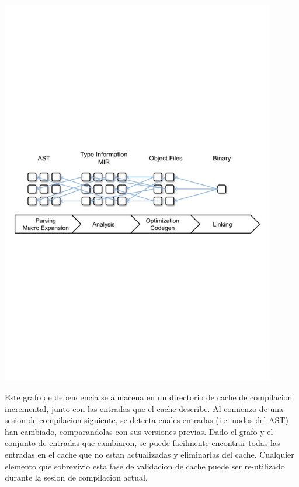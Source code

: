 \documentclass[12pt, a4paper]{report}
\begin{document}
\noindent
\includegraphics[width=0.9\textwidth]{woe16_compiler_dep_graph}

Este grafo de dependencia se almacena en un directorio de cache de compilacion incremental, junto con las entradas que el cache describe.
Al comienzo de una sesion de compilacion siguiente, se detecta cuales entradas (i.e. nodos del AST) han cambiado, comparandolas con sus versiones previas.
Dado el grafo y el conjunto de entradas que cambiaron, se puede facilmente encontrar todas las entradas en el cache que no estan actualizadas y eliminarlas del cache.
Cualquier elemento que sobrevivio esta fase de validacion de cache puede ser re-utilizado durante la sesion de compilacion actual.
\cite{rust_blog_incremental_compilation}
\end{document}
